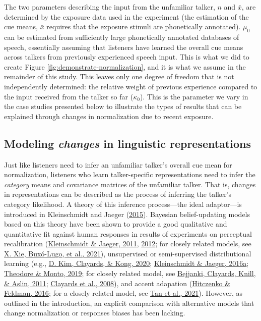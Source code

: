 \documentclass[
  11pt,
  man,floatsintext]{apa6}
\begin{document}
The two parameters describing the input from the unfamiliar talker, \(n\) and \(\bar{x}\), are determined by the exposure data used in the experiment (the estimation of the cue means, \(\bar{x}\) requires that the exposure stimuli are phonetically annotated). \(\mu_0\) can be estimated from sufficiently large phonetically annotated databases of speech, essentially assuming that listeners have learned the overall cue means across talkers from previously experienced speech input. This is what we did to create Figure \ref{fig:demonstrate-normalization}, and it is what we assume in the remainder of this study. This leaves only one degree of freedom that is not independently determined: the relative weight of previous experience compared to the input received from the talker so far (\(\kappa_0\)). This is the parameter we vary in the case studies presented below to illustrate the types of results that can be explained through changes in normalization due to recent exposure.

\hypertarget{sec:ideal-adaptor}{%
\subsection{\texorpdfstring{Modeling \emph{changes} in linguistic representations}{Modeling changes in linguistic representations}}\label{sec:ideal-adaptor}}

Just like listeners need to infer an unfamiliar talker's overall cue mean for normalization, listeners who learn talker-specific representations need to infer the \emph{category} means and covariance matrices of the unfamiliar talker. That is, changes in representations can be described as the process of inferring the talker's category likelihood. A theory of this inference process---the ideal adaptor---is introduced in Kleinschmidt and Jaeger (\protect\hyperlink{ref-kleinschmidt-jaeger2015}{2015}). Bayesian belief-updating models based on this theory have been shown to provide a good qualitative and quantitative fit against human responses in results of experiments on perceptual recalibration (\protect\hyperlink{ref-kleinschmidt-jaeger2011}{Kleinschmidt \& Jaeger, 2011}, \protect\hyperlink{ref-kleinschmidt-jaeger2012}{2012}; for closely related models, see \protect\hyperlink{ref-xie2021cognition}{X. Xie, Buxó-Lugo, et al., 2021}), unsupervised or semi-supervised distributional learning (e.g., \protect\hyperlink{ref-kim2020}{D. Kim, Clayards, \& Kong, 2020}; \protect\hyperlink{ref-kleinschmidt-jaeger2016pbr}{Kleinschmidt \& Jaeger, 2016a}; \protect\hyperlink{ref-theodore-monto2019}{Theodore \& Monto, 2019}; for closely related model, see \protect\hyperlink{ref-bejjanki2011}{Bejjanki, Clayards, Knill, \& Aslin, 2011}; \protect\hyperlink{ref-clayards2008}{Clayards et al., 2008}), and accent adapation (\protect\hyperlink{ref-hitczenko-feldman2016}{Hitczenko \& Feldman, 2016}; for a closely related model, see \protect\hyperlink{ref-tan2021}{Tan et al., 2021}). However, as outlined in the introduction, an explicit comparison with alternative models that change normalization or responses biases has been lacking.
\end{document}
